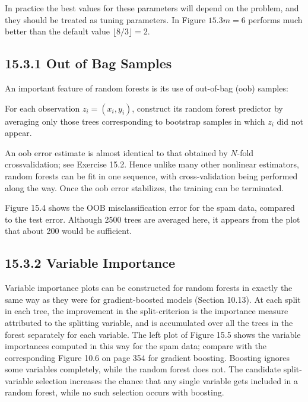 \documentclass[10pt]{article}
\begin{document}
In practice the best values for these parameters will depend on the problem, and they should be treated as tuning parameters. In Figure $15.3 m=6$ performs much better than the default value $\lfloor 8 / 3\rfloor=2$.

\subsection*{15.3.1 Out of Bag Samples}
An important feature of random forests is its use of out-of-bag (oob) samples:

\begin{displayquote}
For each observation $z_{i}=\left(x_{i}, y_{i}\right)$, construct its random forest predictor by averaging only those trees corresponding to bootstrap samples in which $z_{i}$ did not appear.
\end{displayquote}

An oob error estimate is almost identical to that obtained by $N$-fold crossvalidation; see Exercise 15.2. Hence unlike many other nonlinear estimators, random forests can be fit in one sequence, with cross-validation being performed along the way. Once the oob error stabilizes, the training can be terminated.

Figure 15.4 shows the OOB misclassification error for the spam data, compared to the test error. Although 2500 trees are averaged here, it appears from the plot that about 200 would be sufficient.

\subsection*{15.3.2 Variable Importance}
Variable importance plots can be constructed for random forests in exactly the same way as they were for gradient-boosted models (Section 10.13). At each split in each tree, the improvement in the split-criterion is the importance measure attributed to the splitting variable, and is accumulated over all the trees in the forest separately for each variable. The left plot of Figure 15.5 shows the variable importances computed in this way for the spam data; compare with the corresponding Figure 10.6 on page 354 for gradient boosting. Boosting ignores some variables completely, while the random forest does not. The candidate split-variable selection increases the chance that any single variable gets included in a random forest, while no such selection occurs with boosting.
\end{document}

